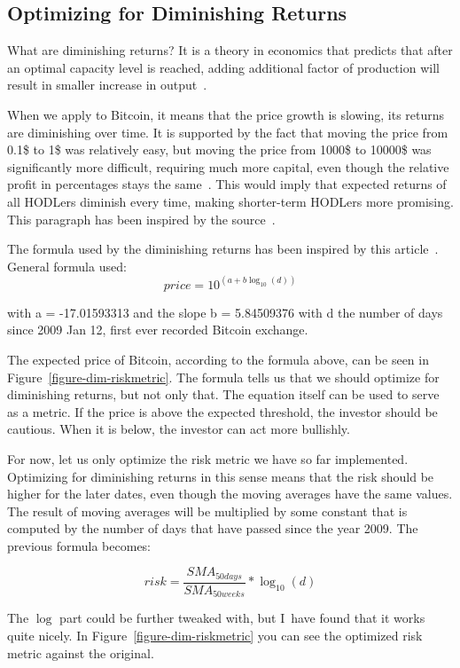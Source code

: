 \subsection*{Optimizing for Diminishing Returns}
\label{subsection-dimreturns}
What are diminishing returns? It is a theory in economics that predicts that after an optimal capacity level is reached, adding additional factor of production will result in smaller increase in output~\cite{investopedia:diminishing-returns}.

When we apply to Bitcoin, it means that the price growth is slowing, its returns are diminishing over time. It is supported by the fact that moving the price from 0.1\$ to 1\$ was relatively easy, but moving the price from 1000\$ to 10000\$ was significantly more difficult, requiring much more capital, even though the relative profit in percentages stays the same~\cite{bitcoin-diminishing-returns}. This would imply that expected returns of all HODLers diminish every time, making shorter-term HODLers more promising. This paragraph has been inspired by the source~\cite{bitcoin-diminishing-returns}.

The formula used by the diminishing returns has been inspired by this article~\cite{bitcoin-diminishing-returns-formula}. General formula used:
$$price = 10^{(a + b \log_{10}(d))}$$

with a = -17.01593313 and the slope b = 5.84509376 with d the number of days since 2009 Jan 12, first ever recorded Bitcoin exchange.

The expected price of Bitcoin, according to the formula above, can be seen in Figure~\ref{figure-dim-riskmetric}. The formula tells us that we should optimize for diminishing returns, but not only that. The equation itself can be used to serve as a metric. If the price is above the expected threshold, the investor should be cautious. When it is below, the investor can act more bullishly.

For now, let us only optimize the risk metric we have so far implemented. Optimizing for diminishing returns in this sense means that the risk should be higher for the later dates, even though the moving averages have the same values. The result of moving averages will be multiplied by some constant that is computed by the number of days that have passed since the year 2009. The previous formula becomes:

$$risk = \frac{\mathit{SMA}_{50 days}}{\mathit{SMA}_{50 weeks}} * \log_{10}(d)$$

The $\log$ part could be further tweaked with, but I~have found that it works quite nicely. In Figure~\ref{figure-dim-riskmetric} you can see the optimized risk metric against the original.

